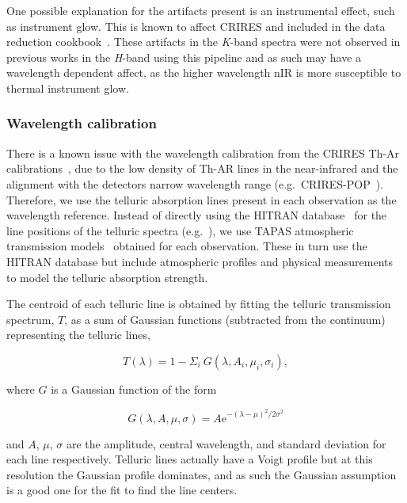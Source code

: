 \documentclass[fleqn,usenatbib]{mnras}
\begin{document}
One possible explanation for the artifacts present is an instrumental effect, such as instrument glow. This is known to affect CRIRES and included in the data reduction cookbook~\citep{smoker_very_2012}. These artifacts in the \textit{K}-band spectra were not observed in previous works in the \textit{H}-band using this pipeline and as such may have a wavelength dependent affect, as the higher wavelength nIR is more susceptible to thermal instrument glow.


\subsubsection{Wavelength calibration}
\label{subsec:wave_cal}
There is a known issue with the wavelength calibration from the CRIRES Th-Ar calibrations~\citep{kerber_laboratory_2009}, due to the low density of Th-AR lines in the near-infrared and the alignment with the detectors narrow wavelength range (e.g.\ CRIRES-POP~\citep{nicholls_crirespop_2017}).
Therefore, we use the telluric absorption lines present in each observation as the wavelength reference. Instead of directly using the HITRAN database~\citep{rothman_hitran2012_2013} for the line positions of the telluric spectra (e.g.~\citep{brogi_signature_2012,brogi_carbon_2014,dekok_detection_2013}), we use TAPAS atmospheric transmission models~\citep{bertaux_tapas_2014} obtained for each observation. These in turn use the HITRAN database but include atmospheric profiles and physical measurements to model the telluric absorption strength.

The centroid of each telluric line is obtained by fitting the telluric transmission spectrum, \(T \), as a sum of Gaussian functions (subtracted from the continuum) representing the telluric lines,

\begin{equation}
T(\lambda) = 1 - {\Sigma}_{i}\ G(\lambda, A_{i}, {\mu}_{i}, {\sigma}_{i}),
\end{equation}

where \(G \) is a Gaussian function of the form

\begin{equation}
G(\lambda, A, \mu, \sigma) = {A \textrm{e}}^{{-(\lambda-\mu)}^{2}/2\sigma^{2}}
\end{equation}

and \(A \), \(\mu \), \(\sigma \) are the amplitude, central wavelength, and standard deviation for each line respectively. Telluric lines actually have a Voigt profile but at this resolution the Gaussian profile dominates, and as such the Gaussian assumption is a good one for the fit to find the line centers.
\end{document}
